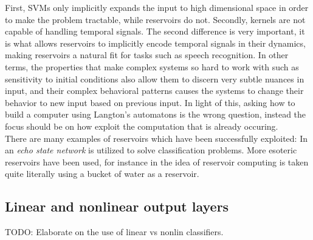 First, SVMs only implicitly expands the input to high dimensional space in order
to make the problem tractable, while reservoirs do not.
Secondly, kernels are not capable of handling temporal signals.
%
The second difference is very important, it is what allows reservoirs to
implicitly encode temporal signals in their dynamics, making reservoirs a
natural fit for tasks such as speech recognition.
% 
In other terms, the properties that make complex systems so hard to work with
such as sensitivity to initial conditions also allow them to discern very subtle
nuances in input, and their complex behavioral patterns causes the systems to
change their behavior to new input based on previous input.
%
In light of this, asking how to build a computer using Langton's automatons is
the wrong question, instead the focus should be on how exploit the computation
that is already occuring.\\
There are many examples of reservoirs which have been successfully exploited:
In \cite{jaeger_adaptive_2003} an \textit{echo state network} 
is utilized to solve classification problems.
More esoteric reservoirs have been used, for instance in
\cite{natschlager_liquid_2002} the idea of reservoir computing is taken quite
literally using a bucket of water as a reservoir.\\

\subsection{Linear and nonlinear output layers}
TODO: Elaborate on the use of linear vs nonlin classifiers.

\cleardoublepage

